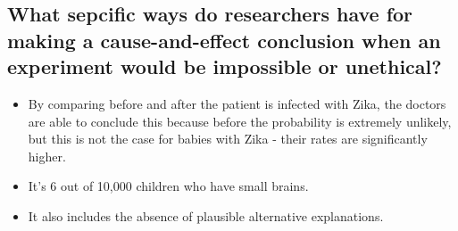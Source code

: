 \documentclass{scrreprt} %
\begin{document}
\subsection{What sepcific ways do researchers have for making a cause-and-effect
conclusion when an experiment would be impossible or unethical?}

\begin{itemize}
	\item By comparing before and after the patient is infected with Zika, the
	doctors are able to conclude this because before the probability is
	extremely unlikely, but this is not the case for babies with Zika - their
	rates are significantly higher.
	\item It's 6 out of 10,000 children who have small brains.
	\item It also includes the absence of plausible alternative explanations.
\end{itemize}
\end{document}
